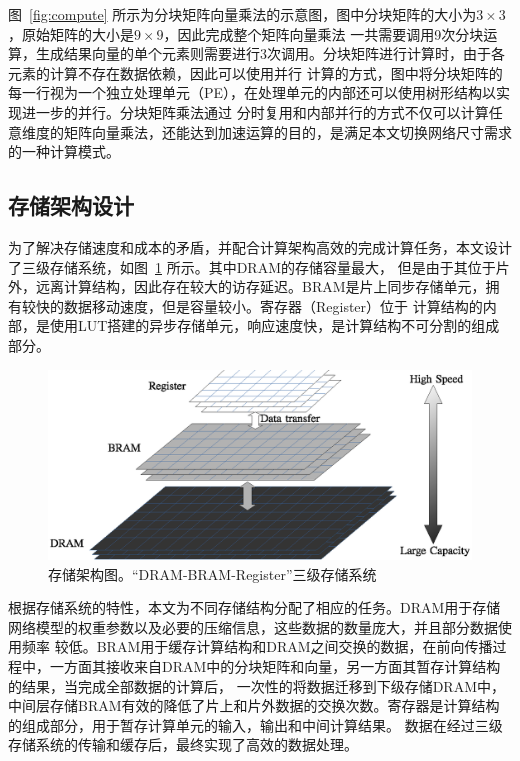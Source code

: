 图~\ref{fig:compute} 所示为分块矩阵向量乘法的示意图，图中分块矩阵的大小为\(3 \times 3\)，原始矩阵的大小是\(9 \times 9\)，因此完成整个矩阵向量乘法
一共需要调用9次分块运算，生成结果向量的单个元素则需要进行3次调用。分块矩阵进行计算时，由于各元素的计算不存在数据依赖，因此可以使用并行
计算的方式，图中将分块矩阵的每一行视为一个独立处理单元（PE），在处理单元的内部还可以使用树形结构以实现进一步的并行。分块矩阵乘法通过
分时复用和内部并行的方式不仅可以计算任意维度的矩阵向量乘法，还能达到加速运算的目的，是满足本文切换网络尺寸需求的一种计算模式。






\subsection{存储架构设计}
为了解决存储速度和成本的矛盾，并配合计算架构高效的完成计算任务，本文设计了三级存储系统，如图~\ref{fig:memory} 所示。其中DRAM的存储容量最大，
但是由于其位于片外，远离计算结构，因此存在较大的访存延迟。BRAM是片上同步存储单元，拥有较快的数据移动速度，但是容量较小。寄存器（Register）位于
计算结构的内部，是使用LUT搭建的异步存储单元，响应速度快，是计算结构不可分割的组成部分。

\begin{figure}
	\centering
	\includegraphics[width=0.7\columnwidth]{exp/fig_memory.eps}
	\caption{存储架构图。“DRAM-BRAM-Register”三级存储系统}
	\label{fig:memory}
\end{figure}

根据存储系统的特性，本文为不同存储结构分配了相应的任务。DRAM用于存储网络模型的权重参数以及必要的压缩信息，这些数据的数量庞大，并且部分数据使用频率
较低。BRAM用于缓存计算结构和DRAM之间交换的数据，在前向传播过程中，一方面其接收来自DRAM中的分块矩阵和向量，另一方面其暂存计算结构的结果，当完成全部数据的计算后，
一次性的将数据迁移到下级存储DRAM中，中间层存储BRAM有效的降低了片上和片外数据的交换次数。寄存器是计算结构的组成部分，用于暂存计算单元的输入，输出和中间计算结果。
数据在经过三级存储系统的传输和缓存后，最终实现了高效的数据处理。
